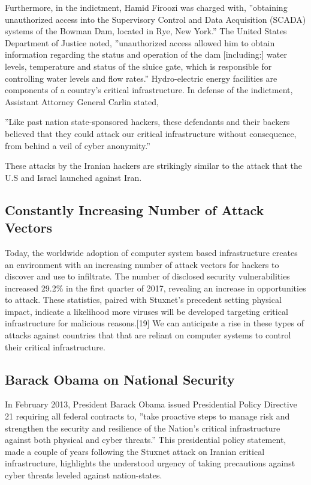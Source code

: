 \documentclass[12pt]{article}
\begin{document}
\begin{multicols}{2}
Furthermore, in the indictment, Hamid Firoozi was charged with, ”obtaining unauthorized access into the Supervisory Control and Data Acquisition (SCADA) systems of the Bowman Dam, located in Rye, New York.”\cite{sevenIraniansIndicted} The United States Department of Justice noted, ”unauthorized access allowed him to obtain information regarding the status and operation of the dam [including:] water levels, temperature and status of the sluice gate, which is responsible for controlling water levels and ﬂow rates.”\cite{sevenIraniansIndicted} Hydro-electric energy facilities are components of a country’s critical infrastructure. In defense of the indictment, Assistant Attorney General Carlin stated,

\begin{displayquote}
”Like past nation state-sponsored hackers, these defendants and their backers believed that they could attack our critical infrastructure without consequence, from behind a veil of cyber anonymity.”
\end{displayquote}

These attacks by the Iranian hackers are strikingly similar to the attack that the U.S and Israel launched against Iran.

\subsection{Constantly Increasing Number of Attack Vectors}

Today, the worldwide adoption of computer system based infrastructure creates an environment with an increasing number of attack vectors for hackers to discover and use to inﬁltrate. The number of disclosed security vulnerabilities increased 29.2\% in the ﬁrst quarter of 2017, revealing an increase in opportunities to attack.\cite{industrialCyberVulnerabilities} These statistics, paired with Stuxnet’s precedent setting physical impact, indicate a likelihood more viruses will be developed targeting critical infrastructure for malicious reasons.[19] We can anticipate a rise in these types of attacks against countries that that are reliant on computer systems to control their critical infrastructure.

\subsection{Barack Obama on National Security}

In February 2013, President Barack Obama issued Presidential Policy Directive 21 requiring all federal contracts to, ”take proactive steps to manage risk and strengthen the security and resilience of the Nation’s critical infrastructure against both physical and cyber threats.”\cite{industrialCyberVulnerabilities} This presidential policy statement, made a couple of years following the Stuxnet attack on Iranian critical infrastructure, highlights the understood urgency of taking precautions against cyber threats leveled against nation-states.


\end{multicols}
\end{document}
